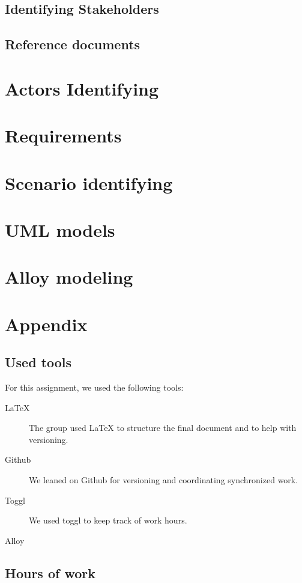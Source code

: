 \documentclass{article}
\begin{document}
		\subsection{Identifying Stakeholders}

		\subsection{Reference documents}

	\newpage
	\section{Actors Identifying}

	\newpage
	\section{Requirements}

	\newpage
	\section{Scenario identifying}

	\newpage
	\section{UML models}

	\newpage
	\section{Alloy modeling}

	\newpage
	\section{Appendix}
		\listoffigures
		\listoftables
		
		\subsection{Used tools}
		For this assignment, we used the following tools:
		
		\begin{description}
			\item [LaTeX] The group used LaTeX to structure the final document and to help with versioning.
			\item [Github] We leaned on Github for versioning and coordinating synchronized work.
			\item [Toggl] We used toggl to keep track of work hours.
			\item [Alloy]
		\end{description}
		
		\subsection{Hours of work}
\end{document}
